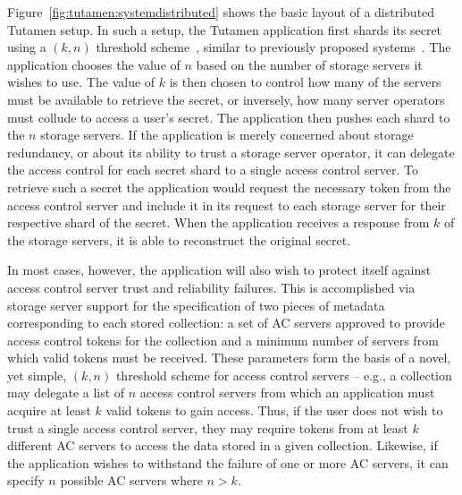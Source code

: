 Figure~\ref{fig:tutamen:systemdistributed} shows the basic layout of a
distributed Tutamen setup. In such a setup, the Tutamen application
first shards its secret using a $(k, n)$ threshold
scheme~\cite{krawczyk1993, shamir1979}, similar to previously proposed
systems~\cite{bessani2011, blaze1996, denning1996}. The application
chooses the value of $n$ based on the number of storage servers it
wishes to use. The value of $k$ is then chosen to control how many of
the servers must be available to retrieve the secret, or inversely,
how many server operators must collude to access a user's secret. The
application then pushes each shard to the $n$ storage servers. If the
application is merely concerned about storage redundancy, or about its
ability to trust a storage server operator, it can delegate the access
control for each secret shard to a single access control server. To
retrieve such a secret the application would request the necessary
token from the access control server and include it in its request to
each storage server for their respective shard of the secret. When the
application receives a response from $k$ of the storage servers, it is
able to reconstruct the original secret.

In most cases, however, the application will also wish to protect
itself against access control server trust and reliability
failures. This is accomplished via storage server support for the
specification of two pieces of metadata corresponding to each stored
collection: a set of AC servers approved to provide access control
tokens for the collection and a minimum number of servers from which
valid tokens must be received. These parameters form the basis of a
novel, yet simple, $(k, n)$ threshold scheme for access control
servers -- e.g., a collection may delegate a list of $n$ access
control servers from which an application must acquire at least $k$
valid tokens to gain access. Thus, if the user does not wish to trust
a single access control server, they may require tokens from at least
$k$ different AC servers to access the data stored in a given
collection. Likewise, if the application wishes to withstand the
failure of one or more AC servers, it can specify $n$ possible AC
servers where $n > k$.

